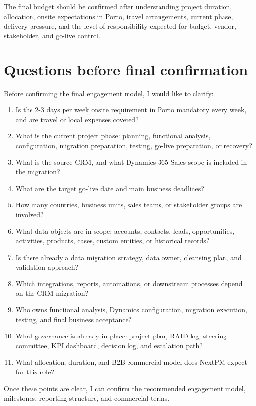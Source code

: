 \documentclass[11pt,a4paper]{article}
\begin{document}
The final budget should be confirmed after understanding project duration, allocation, onsite expectations in Porto, travel arrangements, current phase, delivery pressure, and the level of responsibility expected for budget, vendor, stakeholder, and go-live control.\par

\section*{Questions before final confirmation}

Before confirming the final engagement model, I would like to clarify:\par

\begin{enumerate}
\item Is the 2-3 days per week onsite requirement in Porto mandatory every week, and are travel or local expenses covered?
\item What is the current project phase: planning, functional analysis, configuration, migration preparation, testing, go-live preparation, or recovery?
\item What is the source CRM, and what Dynamics 365 Sales scope is included in the migration?
\item What are the target go-live date and main business deadlines?
\item How many countries, business units, sales teams, or stakeholder groups are involved?
\item What data objects are in scope: accounts, contacts, leads, opportunities, activities, products, cases, custom entities, or historical records?
\item Is there already a data migration strategy, data owner, cleansing plan, and validation approach?
\item Which integrations, reports, automations, or downstream processes depend on the CRM migration?
\item Who owns functional analysis, Dynamics configuration, migration execution, testing, and final business acceptance?
\item What governance is already in place: project plan, RAID log, steering committee, KPI dashboard, decision log, and escalation path?
\item What allocation, duration, and B2B commercial model does NextPM expect for this role?
\end{enumerate}

Once these points are clear, I can confirm the recommended engagement model, milestones, reporting structure, and commercial terms.\par
\end{document}
